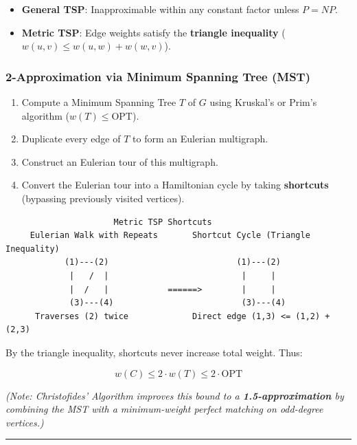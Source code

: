 \documentclass[
]{book}
\providecommand{\tightlist}{%
  \setlength{\itemsep}{0pt}\setlength{\parskip}{0pt}}
\theoremstyle{definition}
\theoremstyle{definition}
\theoremstyle{definition}
\theoremstyle{definition}
\theoremstyle{remark}
\begin{document}
\begin{itemize}
\tightlist
\item
  \textbf{General TSP}: Inapproximable within any constant factor unless \(P = NP\).
\item
  \textbf{Metric TSP}: Edge weights satisfy the \textbf{triangle inequality} (\(w(u, v) \le w(u, w) + w(w, v)\)).
\end{itemize}

\subsubsection{2-Approximation via Minimum Spanning Tree (MST)}\label{approximation-via-minimum-spanning-tree-mst}

\begin{enumerate}
\def\labelenumi{\arabic{enumi}.}
\tightlist
\item
  Compute a Minimum Spanning Tree \(T\) of \(G\) using Kruskal's or Prim's algorithm (\(w(T) \le \text{OPT}\)).
\item
  Duplicate every edge of \(T\) to form an Eulerian multigraph.
\item
  Construct an Eulerian tour of this multigraph.
\item
  Convert the Eulerian tour into a Hamiltonian cycle by taking \textbf{shortcuts} (bypassing previously visited vertices).
\end{enumerate}

\begin{verbatim}
                      Metric TSP Shortcuts
     Eulerian Walk with Repeats       Shortcut Cycle (Triangle Inequality)
            (1)---(2)                          (1)---(2)
             |   /  |                           |     |
             |  /   |            ======>        |     |
             (3)---(4)                          (3)---(4)
      Traverses (2) twice             Direct edge (1,3) <= (1,2) + (2,3)
\end{verbatim}

By the triangle inequality, shortcuts never increase total weight. Thus:

\[w(C) \le 2 \cdot w(T) \le 2 \cdot \text{OPT}\]

\emph{(Note: Christofides' Algorithm improves this bound to a \textbf{1.5-approximation} by combining the MST with a minimum-weight perfect matching on odd-degree vertices.)}

\begin{center}\rule{0.5\linewidth}{0.5pt}\end{center}
\end{document}
